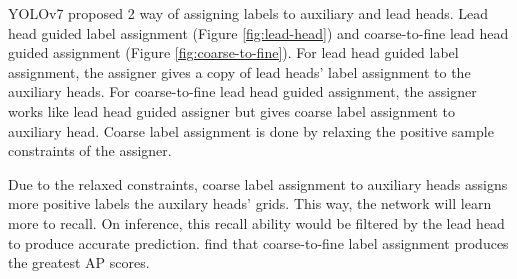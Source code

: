   YOLOv7 proposed 2 way of assigning labels to auxiliary and lead heads. Lead head guided label assignment (Figure \ref{fig:lead-head}) and
  coarse-to-fine lead head guided assignment (Figure \ref{fig:coarse-to-fine}). For lead head guided label assignment, the assigner gives a copy
  of lead heads' label assignment to the auxiliary heads. For coarse-to-fine lead head guided assignment, the 
  assigner works like lead head guided assigner but gives coarse label assignment to auxiliary head. Coarse label
  assignment is done by relaxing the positive sample constraints of the assigner.   

  Due to the relaxed constraints, coarse label assignment to auxiliary heads assigns more positive labels the auxilary heads' grids. 
  This way, the network will learn more to recall.
  On inference, this recall ability would be filtered by the lead head to produce accurate prediction.
  \textcite{yolov7} find that coarse-to-fine
  label assignment produces the greatest AP scores.

